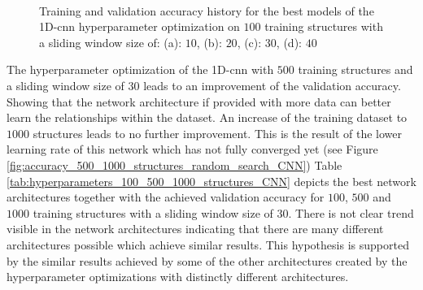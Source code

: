 \documentclass[conference]{IEEEtran}
\begin{document}
\begin{figure}[htp]
	\centering
	\quad
	\\
	\quad
	\caption{Training and validation accuracy history for the best models of the 1D-\gls{cnn} hyperparameter optimization on $ 100 $ training structures with a sliding window size of: (a): $ 10 $, (b): $ 20 $, (c): $ 30 $, (d): $ 40 $}
	\label{fig:accuracy_100_structures_random_search_cnn}
\end{figure}

The hyperparameter optimization of the 1D-\gls{cnn} with $ 500 $ training structures and a sliding window size of $ 30 $ leads to an improvement of the validation accuracy. Showing that the network architecture if provided with more data can better learn the relationships within the dataset. An increase of the training dataset to $ 1000 $ structures leads to no further improvement. This is the result of the lower learning rate of this network which has not fully converged yet (see Figure \ref{fig:accuracy_500_1000_structures_random_search_CNN})  Table \ref{tab:hyperparameters_100_500_1000_structures_CNN} depicts the best network architectures together with the achieved validation accuracy for $ 100 $, $ 500 $ and $ 1000 $ training structures with a sliding window size of $ 30 $. There is not clear trend visible in the network architectures indicating that there are many different architectures possible which achieve similar results. This hypothesis is supported by the similar results achieved by some of the other architectures created by the hyperparameter optimizations with distinctly different architectures.
\end{document}
